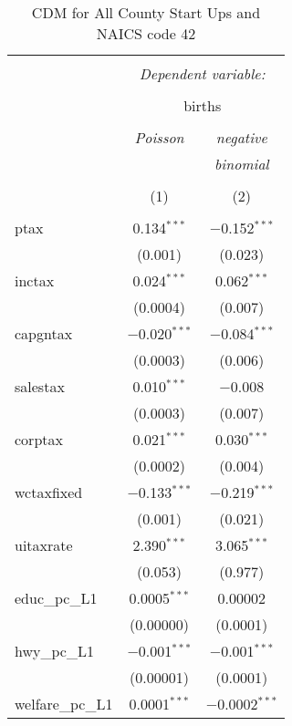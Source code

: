 
\begin{table}[!htbp] \centering 
  \caption{CDM for All County Start Ups and NAICS code 42} 
  \label{} 
\begin{tabular}{@{\extracolsep{5pt}}lcc} 
\\[-1.8ex]\hline 
\hline \\[-1.8ex] 
 & \multicolumn{2}{c}{\textit{Dependent variable:}} \\ 
\cline{2-3} 
\\[-1.8ex] & \multicolumn{2}{c}{births} \\ 
\\[-1.8ex] & \textit{Poisson} & \textit{negative} \\ 
 & \textit{} & \textit{binomial} \\ 
\\[-1.8ex] & (1) & (2)\\ 
\hline \\[-1.8ex] 
 ptax & 0.134$^{***}$ & $-$0.152$^{***}$ \\ 
  & (0.001) & (0.023) \\ 
  inctax & 0.024$^{***}$ & 0.062$^{***}$ \\ 
  & (0.0004) & (0.007) \\ 
  capgntax & $-$0.020$^{***}$ & $-$0.084$^{***}$ \\ 
  & (0.0003) & (0.006) \\ 
  salestax & 0.010$^{***}$ & $-$0.008 \\ 
  & (0.0003) & (0.007) \\ 
  corptax & 0.021$^{***}$ & 0.030$^{***}$ \\ 
  & (0.0002) & (0.004) \\ 
  wctaxfixed & $-$0.133$^{***}$ & $-$0.219$^{***}$ \\ 
  & (0.001) & (0.021) \\ 
  uitaxrate & 2.390$^{***}$ & 3.065$^{***}$ \\ 
  & (0.053) & (0.977) \\ 
  educ\_pc\_L1 & 0.0005$^{***}$ & 0.00002 \\ 
  & (0.00000) & (0.0001) \\ 
  hwy\_pc\_L1 & $-$0.001$^{***}$ & $-$0.001$^{***}$ \\ 
  & (0.00001) & (0.0001) \\ 
  welfare\_pc\_L1 & 0.0001$^{***}$ & $-$0.0002$^{***}$ \\ 

\end{tabular}
\end{table}
